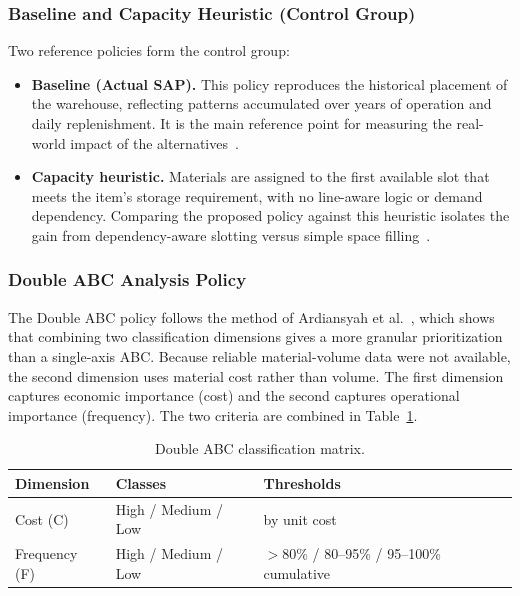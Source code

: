 \documentclass[conference]{IEEEtran}
\begin{document}
\subsubsection{Baseline and Capacity Heuristic (Control Group)}
Two reference policies form the control group:
\begin{itemize}
\item \textbf{Baseline (Actual SAP).} This policy reproduces the historical
placement of the warehouse, reflecting patterns accumulated over years of
operation and daily replenishment. It is the main reference point for
measuring the real-world impact of the alternatives~\cite{kokroko2025}.
\item \textbf{Capacity heuristic.} Materials are assigned to the first
available slot that meets the item's storage requirement, with no line-aware
logic or demand dependency. Comparing the proposed policy against this
heuristic isolates the gain from dependency-aware slotting versus simple space
filling~\cite{roodbergen2009}.
\end{itemize}

\subsubsection{Double ABC Analysis Policy}
The Double ABC policy follows the method of
Ardiansyah et al.~\cite{ardiansyah2024}, which shows that combining two
classification dimensions gives a more granular prioritization than a
single-axis ABC. Because reliable material-volume data were not available,
the second dimension uses material cost rather than volume. The first
dimension captures economic importance (cost) and the second captures
operational importance (frequency). The two criteria are combined in
Table~\ref{tab:doubleabc}.

\begin{table}[htbp]
\centering
\caption{Double ABC classification matrix.}
\label{tab:doubleabc}
\begin{tabular}{lll}
\toprule
Dimension & Classes & Thresholds \\
\midrule
Cost (C) & High / Medium / Low & by unit cost \\
Frequency (F) & High / Medium / Low & $>80\%$ / 80--95\% / 95--100\% cumulative \\
\bottomrule
\end{tabular}
\end{table}
\end{document}

